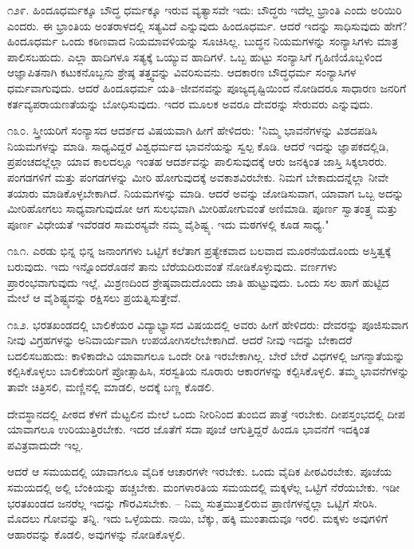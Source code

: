 ೧೨೯. ಹಿಂದೂಧರ್ಮಕ್ಕೂ ಬೌದ್ಧ ಧರ್ಮಕ್ಕೂ ಇರುವ ವ್ಯತ್ಯಾಸವೇ ಇದು: ಬೌದ್ಧರು ಇದೆಲ್ಲ ಭ್ರಾಂತಿ ಎಂದು ಅರಿಯಿರಿ ಎಂದರು. ಈ ಭ್ರಾಂತಿಯ ಅಂತರಾಳದಲ್ಲಿ ಸತ್ಯವಿದೆ ಎನ್ನುವುದು ಹಿಂದೂಧರ್ಮ. ಆದರೆ ಇದನ್ನು ಸಾಧಿಸುವುದು ಹೇಗೆ? ಹಿಂದೂಧರ್ಮ ಒಂದು ಕಠಿಣವಾದ ನಿಯಮಾವಳಿಯನ್ನು ಸೂಚಿಸಿಲ್ಲ. ಬುದ್ಧನ ನಿಯಮಗಳನ್ನು ಸಂನ್ಯಾಸಿಗಳು ಮಾತ್ರ ಪಾಲಿಸಬಹುದು. ಎಲ್ಲಾ ಹಾದಿಗಳೂ ಸತ್ಯಕ್ಕೆ ಒಯ್ಯುವ ಹಾದಿಗಳೆ. ಒಬ್ಬ ಹುಟ್ಟು ಸಂನ್ಯಾಸಿಗೆ ಗೃಹಿಣಿಯೊಬ್ಬಳಿಂದ ಆಜ್ಞಾಪಿತನಾಗಿ ಕಟುಕನೊಬ್ಬನು ಶ್ರೇಷ್ಠ ತತ್ತ್ವವನ್ನು ವಿವರಿಸುವನು. ಆದಕಾರಣ ಬೌದ್ಧಧರ್ಮ ಸಂನ್ಯಾಸಿಗಳ ಧರ್ಮವಾಗುವುದು. ಆದರೆ ಹಿಂದೂಧರ್ಮ ಯತಿ–ಜೀವನವನ್ನು ಪೂಜ್ಯದೃಷ್ಟಿಯಿಂದ ನೋಡಿದರೂ ಸಾಧಾರಣ ಜನರಿಗೆ ಕರ್ತವ್ಯಪರಾಯಣತೆಯನ್ನು ಬೋಧಿಸುವುದು. ಇದರ ಮೂಲಕ ಅವರೂ ದೇವರನ್ನು ಸೇರುವರು ಎನ್ನುವುದು.

೧೩೦. ಸ್ತ್ರೀಯರಿಗೆ ಸಂನ್ಯಾಸದ ಆದರ್ಶದ ವಿಷಯವಾಗಿ ಹೀಗೆ ಹೇಳಿದರು: "ನಿಮ್ಮ ಭಾವನೆಗಳನ್ನು ವಿಶದಪಡಿಸಿ ನಿಯಮಗಳನ್ನು ಮಾಡಿ. ಸಾಧ್ಯವಿದ್ದರೆ ವಿಶ್ವಧರ್ಮದ ಭಾವನೆಯನ್ನು ಸ್ವಲ್ಪ ಕೊಡಿ. ಆದರೆ ಇದನ್ನು ಜ್ಞಾಪಕದಲ್ಲಿಡಿ, ಪ್ರಪಂಚದಲ್ಲೆಲ್ಲಾ ಯಾವ ಕಾಲದಲ್ಲೂ ಇಂತಹ ಆದರ್ಶವನ್ನು ಪಾಲಿಸುವುದಕ್ಕೆ ಆರು ಜನಕ್ಕಿಂತ ಜಾಸ್ತಿ ಸಿಕ್ಕಲಾರರು. ಪಂಗಡಗಳಿಗೆ ಮತ್ತು ಪಂಗಡಗಳನ್ನು ಮೀರಿ ಹೋಗುವುದಕ್ಕೆ ಅವಕಾಶವಿರಬೇಕು. ನಿಮಗೆ ಬೇಕಾದುದನ್ನೆಲ್ಲಾ ನೀವೇ ತಯಾರು ಮಾಡಿಕೊಳ್ಳಬೇಕಾಗಿದೆ. ನಿಯಮಗಳನ್ನು ಮಾಡಿ. ಆದರೆ ಅವನ್ನು ಜೋಡಿಸುವಾಗ, ಯಾವಾಗ ಒಬ್ಬ ಅದನ್ನು ಮೀರಿಹೋಗಲು ಸಾಧ್ಯವಾಗುವುದೋ ಆಗ ಸುಲಭವಾಗಿ ಮೀರಿಹೋಗುವಂತೆ ಅಣಿಮಾಡಿ. ಪೂರ್ಣ ಸ್ವಾತಂತ್ರ್ಯ ಮತ್ತು ಪೂರ್ಣ ವಿಧೇಯತೆ ಇವೆರಡರ ಸಾಮರಸ್ಯವೇ ನಮ್ಮ ವೈಶಿಷ್ಟ್ಯ. ಇದು ಮಠಗಳಲ್ಲಿ ಕೂಡ ಸಾಧ್ಯ."

೧೩೧. ಎರಡು ಭಿನ್ನ ಭಿನ್ನ ಜನಾಂಗಗಳು ಒಟ್ಟಿಗೆ ಕಲೆತಾಗ ಪ್ರತ್ಯೇಕವಾದ ಬಲವಾದ ಮೂರನೆಯದೊಂದು ಅಸ್ತಿತ್ವಕ್ಕೆ ಬರುವುದು. ಇದು ಇನ್ನೊಂದರೊಡನೆ ತಾನು ಬೆರೆಯದಿರುವಂತೆ ನೋಡಿಕೊಳ್ಳುವುದು. ವರ್ಣಗಳು ಪ್ರಾರಂಭವಾಗುವುದು ಇಲ್ಲೆ. ಮಿಶ್ರಣದಿಂದ ಶ್ರೇಷ್ಠವಾದುದೊಂದು ಜಾತಿ ಹುಟ್ಟುವುದು. ಒಂದು ಸಲ ಹಾಗೆ ಹುಟ್ಟಿದ ಮೇಲೆ ಆ ವೈಶಿಷ್ಟ್ಯವನ್ನು ರಕ್ಷಿಸಲು ಪ್ರಯತ್ನಿಸುತ್ತೇವೆ.

೧೩೨. ಭರತಖಂಡದಲ್ಲಿ ಬಾಲಿಕೆಯರ ವಿದ್ಯಾಭ್ಯಾಸದ ವಿಷಯದಲ್ಲಿ ಅವರು ಹೀಗೆ ಹೇಳಿದರು: ದೇವರನ್ನು ಪೂಜಿಸುವಾಗ ನೀವು ವಿಗ್ರಹಗಳನ್ನು ಅನಿವಾರ್ಯವಾಗಿ ಉಪಯೋಗಿಸಲೇಬೇಕಾಗಿದೆ. ಆದರೆ ನೀವು ಇದನ್ನು ಬೇಕಾದರೆ ಬದಲಿಸಬಹುದು: ಕಾಳಿಕಾದೇವಿ ಯಾವಾಗಲೂ ಒಂದೇ ರೀತಿ ಇರಬೇಕಾಗಿಲ್ಲ. ಬೇರೆ ಬೇರೆ ವಿಧಗಳಲ್ಲಿ ಜಗನ್ಮಾತೆಯನ್ನು ಕಲ್ಪಿಸಿಕೊಳ್ಳಲು ಬಾಲಿಕೆಯರಿಗೆ ಪ್ರೋತ್ಸಾಹಿಸಿ, ಸರಸ್ವತಿಯ ನೂರಾರು ಆಕಾರಗಳನ್ನು ಕಲ್ಪಿಸಿಕೊಳ್ಳಲಿ. ತಮ್ಮ ಭಾವನೆಗಳನ್ನು ತಾವೇ ಚಿತ್ರಿಸಲಿ, ಮಣ್ಣಿನಲ್ಲಿ ಮಾಡಲಿ, ಅದಕ್ಕೆ ಬಣ್ಣ ಕೊಡಲಿ.

ದೇವಸ್ಥಾನದಲ್ಲಿ ಪೀಠದ ಕೆಳಗೆ ಮೆಟ್ಟಲಿನ ಮೇಲೆ ಒಂದು ನೀರಿನಿಂದ ತುಂಬಿದ ಪಾತ್ರೆ ಇರಬೇಕು. ದೀಪಸ್ತಂಭದಲ್ಲಿ ದೀಪ ಯಾವಾಗಲೂ ಉರಿಯುತ್ತಿರಬೇಕು. ಇದರ ಜೊತೆಗೆ ಸದಾ ಪೂಜೆ ಆಗುತ್ತಿದ್ದರೆ ಹಿಂದೂ ಭಾವನೆಗೆ ಇದಕ್ಕಿಂತ ಪವಿತ್ರವಾದುದೇ ಇಲ್ಲ.

ಆದರೆ ಆ ಸಮಯದಲ್ಲಿ ಯಾವಾಗಲೂ ವೈದಿಕ ಆಚಾರಗಳೇ ಇರಬೇಕು. ಒಂದು ವೈದಿಕ ಪೀಠವಿರಬೇಕು. ಪೂಜೆಯ ಸಮಯದಲ್ಲಿ ಅಲ್ಲಿ ಬೆಂಕಿಯನ್ನು ಹಚ್ಚಬೇಕು. ಮಂಗಳಾರತಿಯ ಸಮಯದಲ್ಲಿ ಮಕ್ಕಳೆಲ್ಲ ಒಟ್ಟಿಗೆ ನೆರೆಯಬೇಕು. ಇಡೀ ಭರತಖಂಡದ ಜನರೆಲ್ಲ ಇದನ್ನು ಗೌರವಿಸಬೇಕು. – ನಿಮ್ಮ ಸುತ್ತಮುತ್ತಲಿರುವ ಪ್ರಾಣಿಗಳನ್ನೆಲ್ಲಾ ಒಟ್ಟಿಗೆ ಸೇರಿಸಿ. ಮೊದಲು ಗೋವನ್ನು ತನ್ನಿ. ಇದು ಒಳ್ಳೆಯದು. ನಾಯಿ, ಬೆಕ್ಕು, ಹಕ್ಕಿ ಮುಂತಾದುವೂ ಇರಲಿ. ಮಕ್ಕಳು ಅವುಗಳಿಗೆ ಆಹಾರವನ್ನು ಕೊಡಲಿ, ಅವುಗಳನ್ನು ನೋಡಿಕೊಳ್ಳಲಿ.

